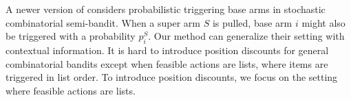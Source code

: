 \documentclass{article}
\newcommand{\RR}{\mathbb{R}}
\newcommand{\bA}{\mathbf{A}}
\newcommand{\ba}{\mathbf{a}}
\newcommand{\bw}{\mathbf{w}}
\newcommand{\cS}{\mathcal{S}}
\newcommand{\abs}[1]{\left| #1 \right|}
\newcommand{\norm}[1]{\| #1 \|}
\newcommand{\shengyu}[1]{{\color{green!50!black} [\text{Shengyu:} #1]}}
\begin{document}
A newer version of \cite{chen2013combinatorial} considers probabilistic triggering base arms in stochastic combinatorial semi-bandit. When a super arm $S$ is pulled, base arm $i$ might also be triggered with a probability $p_i^{S}$. Our method can generalize their setting with contextual information. It is hard to introduce position discounts for general combinatorial bandits except when feasible actions are lists, where items are triggered in list order. To introduce position discounts, we focus on the setting where feasible actions are lists.




\end{document}
